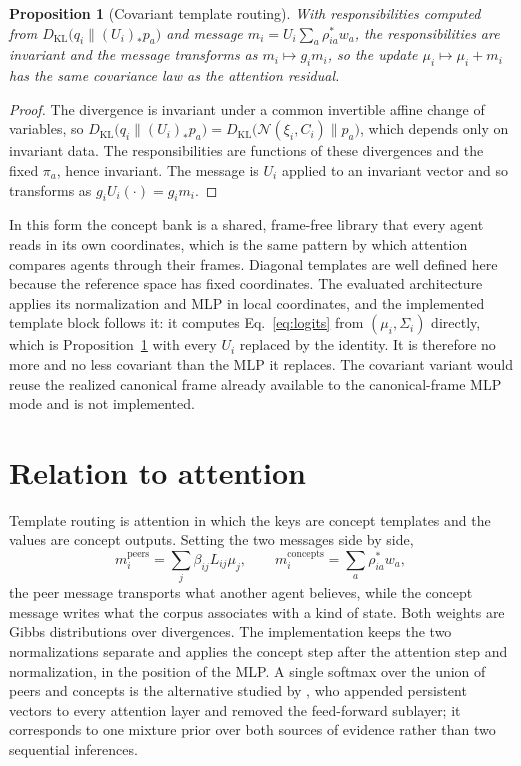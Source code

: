 \documentclass[11pt]{article}
\newtheorem{proposition}{Proposition}
\theoremstyle{definition}
\theoremstyle{remark}
\newcommand{\KL}{D_{\mathrm{KL}}}
\newcommand{\N}{\mathcal{N}}
\begin{document}
\begin{proposition}[Covariant template routing]
\label{prop:covariant}
With responsibilities computed from $\KL\bigl(q_i\|(U_i)_*p_a\bigr)$ and message $m_i=U_i\sum_a\rho^{*}_{ia}w_a$, the responsibilities are invariant and the message transforms as $m_i\mapsto g_im_i$, so the update $\mu_i\mapsto\mu_i+m_i$ has the same covariance law as the attention residual.
\end{proposition}

\begin{proof}
The divergence is invariant under a common invertible affine change of variables, so $\KL\bigl(q_i\|(U_i)_*p_a\bigr)=\KL\bigl(\N(\xi_i,C_i)\|p_a\bigr)$, which depends only on invariant data. The responsibilities are functions of these divergences and the fixed $\pi_a$, hence invariant. The message is $U_i$ applied to an invariant vector and so transforms as $g_iU_i(\cdot)=g_im_i$.
\end{proof}

In this form the concept bank is a shared, frame-free library that every agent reads in its own coordinates, which is the same pattern by which attention compares agents through their frames. Diagonal templates are well defined here because the reference space has fixed coordinates. The evaluated architecture applies its normalization and MLP in local coordinates, and the implemented template block follows it: it computes Eq.~\eqref{eq:logits} from $(\mu_i,\Sigma_i)$ directly, which is Proposition~\ref{prop:covariant} with every $U_i$ replaced by the identity. It is therefore no more and no less covariant than the MLP it replaces. The covariant variant would reuse the realized canonical frame already available to the canonical-frame MLP mode and is not implemented.

\section{Relation to attention}

Template routing is attention in which the keys are concept templates and the values are concept outputs. Setting the two messages side by side,
\begin{equation}
m_i^{\mathrm{peers}}=\sum_j\beta_{ij}L_{ij}\mu_j,
\qquad
m_i^{\mathrm{concepts}}=\sum_a\rho^{*}_{ia}w_a,
\end{equation}
the peer message transports what another agent believes, while the concept message writes what the corpus associates with a kind of state. Both weights are Gibbs distributions over divergences. The implementation keeps the two normalizations separate and applies the concept step after the attention step and normalization, in the position of the MLP. A single softmax over the union of peers and concepts is the alternative studied by \citet{sukhbaatar2019}, who appended persistent vectors to every attention layer and removed the feed-forward sublayer; it corresponds to one mixture prior over both sources of evidence rather than two sequential inferences.
\end{document}
